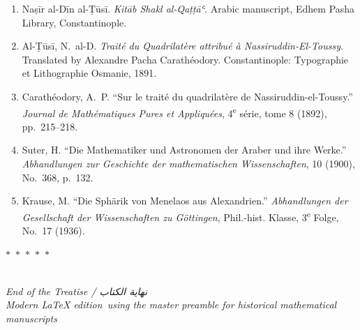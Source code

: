 \documentclass[11pt,a4paper]{article}
\theoremstyle{plain}
\theoremstyle{definition}
\theoremstyle{remark}
\newcommand{\ar}[1]{{\arabicfont\beginR #1\endR}}
\newcommand{\dblornament}{\begin{center}\textcolor{goldaccent}{$\ast$~$\ast$~$\ast$~$\ast$~$\ast$}\end{center}}
\begin{document}
\begin{enumerate}

\item Naṣīr al-Dīn al-Ṭūsī. \textit{Kitāb Shakl al-Qaṭṭāʿ}. Arabic manuscript, Edhem Pasha Library, Constantinople.

\item Al-Ṭūsī, N.~al-D. \textit{Traité du Quadrilatère attribué à Nassiruddin-El-Toussy}. Translated by Alexandre Pacha Carathéodory. Constantinople: Typographie et Lithographie Osmanie, 1891.

\item Carathéodory, A.~P. ``Sur le traité du quadrilatère de Nassiruddin-el-Toussy.'' \textit{Journal de Mathématiques Pures et Appliquées}, 4\textsuperscript{e} série, tome 8 (1892), pp.~215--218.

\item Suter, H. ``Die Mathematiker und Astronomen der Araber und ihre Werke.'' \textit{Abhandlungen zur Geschichte der mathematischen Wissenschaften}, 10 (1900), No.~368, p.~132.

\item Krause, M. ``Die Sphärik von Menelaos aus Alexandrien.'' \textit{Abhandlungen der Gesellschaft der Wissenschaften zu Göttingen}, Phil.-hist. Klasse, 3\textsuperscript{e} Folge, No.~17 (1936).

\end{enumerate}



\vspace{1cm}

\begin{center}

\dblornament\\[0.5cm]

{\small\textit{End of the Treatise / \ar{نهاية الكتاب}}}\\[0.3cm]

{\small\textit{Modern LaTeX edition\ using the master preamble for historical mathematical manuscripts}}

\end{center}
\end{document}
